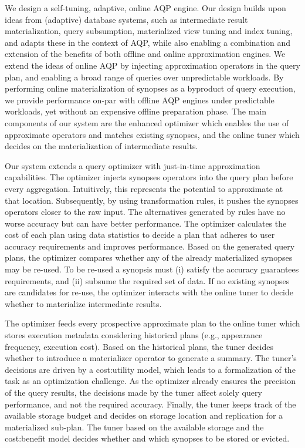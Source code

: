 We design a self-tuning, adaptive, online AQP engine. Our design 
builds upon ideas from (adaptive) database systems, such as 
intermediate result materialization, query subsumption, materialized 
view tuning and index tuning, and adapts these in the context of AQP, 
while also enabling a combination and extension of the benefits of both offline 
and online approximation engines. 
%
We extend the ideas of online AQP by injecting approximation 
operators in the query plan, and enabling a broad range of queries over 
unpredictable workloads.
By performing online materialization of synopses as a byproduct of 
query execution, we provide performance on-par with offline AQP 
engines under predictable workloads, yet without an expensive offline 
preparation phase. 
%
The main components of our system are the enhanced optimizer which enables the 
use of approximate operators and matches existing synopses, and the 
online tuner which decides on the materialization of intermediate results.

 Our system extends 
a query optimizer with just-in-time approximation capabilities. 
The optimizer injects synopses operators into the query plan before 
every aggregation. Intuitively, this represents the potential to 
approximate at that location. 
Subsequently, by using transformation rules, it pushes the synopses 
operators closer to the raw input. The alternatives generated by 
rules have no worse accuracy but can have better performance. 
The optimizer calculates the cost of each plan using data statistics 
to decide a plan that adheres to user accuracy requirements and 
improves performance.
%
Based on the generated query plans, the optimizer compares whether 
any of the already materialized synopses may be re-used. To be 
re-used a synopsis must (i) satisfy the accuracy guarantees  
requirements, and (ii) subsume the required set of data.
%
If no existing synopses are candidates for re-use, the optimizer 
interacts with the online tuner to decide whether to materialize 
intermediate results.

The optimizer feeds every prospective approximate plan to the online 
tuner which stores execution metadata considering historical plans 
(e.g., appearance frequency, execution cost).
%
Based on the historical plans, the tuner decides whether to introduce 
a materializer operator to generate a summary. The tuner's
decisions are driven by a cost:utility model, which leads to a 
formalization of the task as an optimization challenge. As the 
optimizer already ensures the precision of the query results, the 
decisions made by the tuner affect solely query performance, and not 
the required accuracy.
%
Finally, the tuner keeps track of the available storage budget and 
decides on storage location and replication for a materialized 
sub-plan. The tuner based on the available storage and the 
cost:benefit model decides whether and which synopses to be stored or 
evicted.

